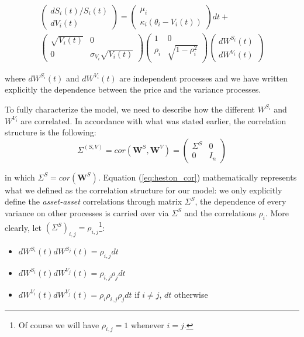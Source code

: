  \begin{multline}
 \label{eq:mv_heston}
\begin{pmatrix}
	dS_i(t) / S_i(t)\\
	dV_i(t)
\end{pmatrix}
= \begin{pmatrix}
\mu_i\\
\kappa_i (\theta_i - V_i(t))
\end{pmatrix}
dt  +\\ \begin{pmatrix}
\sqrt{V_i(t)} & 0 \\
0 & \sigma_{V_i} \sqrt{V_i(t)} 
\end{pmatrix}
\begin{pmatrix}
1 & 0 \\
 \rho_i & \sqrt{1-\rho_i^2} 
\end{pmatrix}
\begin{pmatrix}
dW^{S_i}(t)\\
dW^{V_i }(t)
\end{pmatrix}
\end{multline}

where $dW^{S_i}(t)$ and $dW^{V_i}(t)$ are independent processes and we have written explicitly the dependence between the price and the variance processes.

To fully characterize the model, we need to describe how the different $W^{S_i}$ and $W^{V_i}$ are correlated. In accordance with what was stated earlier, the correlation structure is the following:
\begin{equation}
\label{eq:heston_cor}
\Sigma^{(S,V)} = cor(\boldsymbol{W}^{S}, \boldsymbol{W}^{V}) = \begin{pmatrix}
\Sigma^{S} & 0 \\
0& I_n
\end{pmatrix}
\end{equation}

in which $\Sigma^S = cor(\boldsymbol{W}^{S})$.
Equation (\ref{eq:heston_cor}) mathematically represents what we defined as the correlation structure for our model: we only explicitly define the \textit{asset-asset} correlations through matrix $\Sigma^S$, the dependence of every variance  on other processes is carried over via $\Sigma^S$ and the correlations $\rho_i$.
More clearly, let $(\Sigma^S)_{i,j} = \rho_{i,j}$\footnote{Of course we will have $\rho_{i,j} = 1 $ whenever $i=j$.}:
\begin{itemize}
	\item $dW^{S_i}(t) dW^{S_j}(t) = \rho_{i,j} dt$
	\item $dW^{S_i}(t) dW^{V_j}(t) = \rho_{i,j} \rho_j dt$
	\item $dW^{V_i}(t) dW^{V_j}(t) = \rho_i \rho_{i,j}\rho_j dt $ if $i\neq j$, $dt$ otherwise
\end{itemize}

